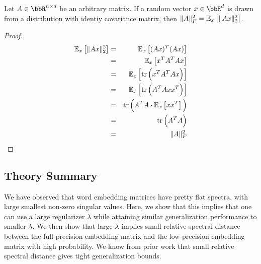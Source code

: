 \begin{lemma}
\label{lemma2}
Let $A \in \RR^{n\times d}$ be an arbitrary matrix. If a random vector $x \in \RR^d$ is drawn from a distribution with identiy covariance matrix, then $\|A\|_F^2 = \expect{x}{\|Ax\|_2^2}$.
\end{lemma}
\begin{proof}
\begin{eqnarray*}
\expect{x}{\|Ax\|_2^2} &=& \expect{x}{(Ax)^T (Ax)} \\
&=& \expect{x}{x^T A^T A x} \\
&=& \expect{x}{\tr \Big(x^T A^T A x\Big)} \\
&=& \expect{x}{\tr \Big(A^T A x x^T\Big)} \\
&=& \tr \Big(A^T A \cdot \expect{x}{x x^T}\Big) \\
&=& \tr \Big(A^T A\Big) \\
&=& \|A\|_F^2 \\
\end{eqnarray*}
\end{proof}


\subsection{Theory Summary}
We have observed that word embedding matrices have pretty flat spectra, with large smallest non-zero singular values.  Here, we show that this implies that one can use a large regularizer $\lambda$ while attaining similar generalization performance to smaller $\lambda$.  We then show that large $\lambda$ implies small relative spectral distance between the full-precision embedding matrix and the low-precision embedding matrix with high probability.  We know from prior work that small relative spectral distance gives tight generalization bounds.

